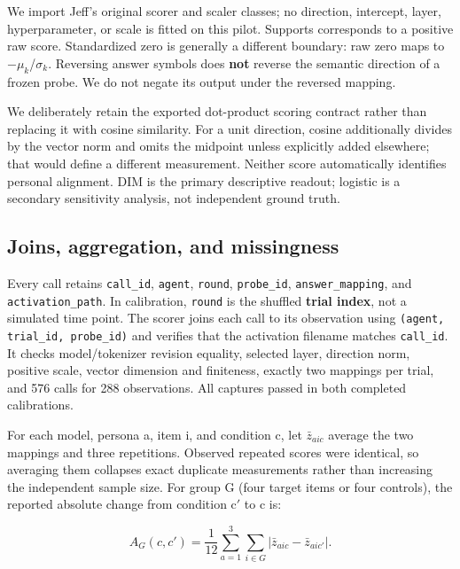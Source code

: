 We import Jeff's original scorer and scaler classes; no direction, intercept, layer, hyperparameter, or scale is fitted on this pilot. Supports corresponds to a positive raw score. Standardized zero is generally a different boundary: raw zero maps to \ensuremath{-}\(\mu_{k}\)/\(\sigma_{k}\). Reversing answer symbols does \textbf{not} reverse the semantic direction of a frozen probe. We do not negate its output under the reversed mapping.

We deliberately retain the exported dot-product scoring contract rather than replacing it with cosine similarity. For a unit direction, cosine additionally divides by the vector norm and omits the midpoint unless explicitly added elsewhere; that would define a different measurement. Neither score automatically identifies personal alignment. DIM is the primary descriptive readout; logistic is a secondary sensitivity analysis, not independent ground truth.

\subsection{Joins, aggregation, and missingness}\label{joins-aggregation-and-missingness}

Every call retains \nolinkurl{call_id}, \texttt{agent}, \texttt{round}, \nolinkurl{probe_id}, \nolinkurl{answer_mapping}, and \nolinkurl{activation_path}. In calibration, \texttt{round} is the shuffled \textbf{trial index}, not a simulated time point. The scorer joins each call to its observation using \nolinkurl{(agent, trial_id, probe_id)} and verifies that the activation filename matches \nolinkurl{call_id}. It checks model/tokenizer revision equality, selected layer, direction norm, positive scale, vector dimension and finiteness, exactly two mappings per trial, and 576 calls for 288 observations. All captures passed in both completed calibrations.

For each model, persona a, item i, and condition c, let \(\bar z_{aic}\) average the two mappings and three repetitions. Observed repeated scores were identical, so averaging them collapses exact duplicate measurements rather than increasing the independent sample size. For group G (four target items or four controls), the reported absolute change from condition c\ensuremath{\prime} to c is:

\begin{equation}\label{eq:absolute}
A_G(c,c')=\frac{1}{12}\sum_{a=1}^{3}\sum_{i\in G}
\left|\bar z_{aic}-\bar z_{aic'}\right|.
\end{equation}

